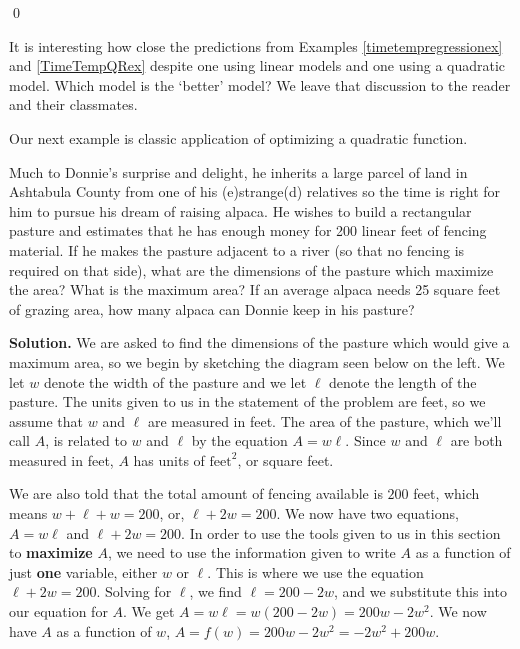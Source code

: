 \begin{ex}
\begin{enumerate}
\begin{center}
 \end{center}
 
 \qed
 
 \end{enumerate}
 
 \end{ex}

It is interesting how close the predictions from  Examples \ref{timetempregressionex} and  \ref{TimeTempQRex} despite one using linear models and one using a quadratic model.  Which model is the `better' model?  We leave that discussion to the reader and their classmates.

\medskip

Our next example is classic application of optimizing a quadratic function.

\begin{ex} \label{donniealpaca} Much to Donnie's surprise and delight, he inherits a large parcel of land in Ashtabula County from one of his (e)strange(d) relatives so the time is right for him to pursue his dream of raising alpaca.  He wishes to build a rectangular pasture and estimates that he has enough money for 200 linear feet of fencing material.  If he makes the pasture adjacent to a river (so that no fencing is required on that side), what are the dimensions of the pasture which maximize the area?  What is the maximum area?  If an average alpaca needs 25 square feet of grazing area, how many alpaca can Donnie keep in his pasture?

\pagebreak

{\bf Solution.} We are asked to find the dimensions of the pasture which would give a maximum area, so we begin by sketching the diagram seen below on the left.  We let $w$ denote the width of the pasture and we let $\ell$ denote the length of the pasture.  The units given to us in the statement of the problem are feet, so we assume that $w$ and $\ell$ are measured in feet.  The area of the pasture, which we'll call $A$, is related to $w$ and $\ell$ by the equation $A = w \ell$.  Since $w$ and $\ell$ are both measured in feet, $A$ has units of $\text{feet}^2$, or square feet.  

\medskip

We are also told that the total amount of fencing available is $200$ feet, which means $w + \ell + w = 200$, or, $\ell+2w = 200$.  We now have two equations, $A = w \ell$ and $\ell+2w = 200$.  In order to use the tools given to us in this section to \textbf{maximize} $A$, we need to use the information given to write $A$ as a function of just \textbf{one} variable, either $w$ or $\ell$. This is where we use the equation $\ell+2w = 200$.  Solving for $\ell$, we find $\ell = 200-2w$, and we substitute this into our equation for $A$.  We get $A = w \ell = w(200-2w) = 200w-2w^2$.  We now have $A$ as a function of $w$, $A = f(w) = 200w-2w^2 = -2w^2+200w$. 


\end{ex}
